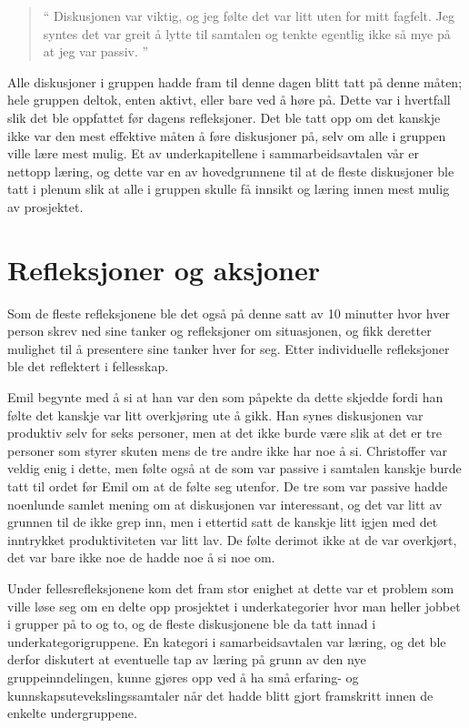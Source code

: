 \begin{quote}``
Diskusjonen var viktig, og jeg følte det var litt uten for mitt fagfelt. Jeg syntes det var greit å lytte til samtalen og tenkte egentlig ikke så mye på at jeg var passiv.
''\end{quote} 

Alle diskusjoner i gruppen hadde fram til denne dagen blitt tatt på denne måten; hele gruppen deltok, enten aktivt, eller bare ved å høre på. Dette var i hvertfall slik det ble oppfattet før dagens refleksjoner. Det ble tatt opp om det kanskje ikke var den mest effektive måten å føre diskusjoner på, selv om alle i gruppen ville lære mest mulig. Et av underkapitellene i sammarbeidsavtalen vår er nettopp læring, og dette var en av hovedgrunnene til at de fleste diskusjoner ble tatt i plenum slik at alle i gruppen skulle få innsikt og læring innen mest mulig av prosjektet.

\section{Refleksjoner og aksjoner}
Som de fleste refleksjonene ble det også på denne satt av 10 minutter hvor hver person skrev ned sine tanker og refleksjoner om situasjonen, og fikk deretter mulighet til å presentere sine tanker hver for seg. Etter individuelle refleksjoner ble det reflektert i fellesskap.

Emil begynte med å si at han var den som påpekte da dette skjedde fordi han følte det kanskje var litt overkjøring ute å gikk. Han synes diskusjonen var produktiv selv for seks personer, men at det ikke burde være slik at det er tre personer som styrer skuten mens de tre andre ikke har noe å si. Christoffer var veldig enig i dette, men følte også at de som var passive i samtalen kanskje burde tatt til ordet før Emil om at de følte seg utenfor. De tre som var passive hadde noenlunde samlet mening om at diskusjonen var interessant, og det var litt av grunnen til de ikke grep inn, men i ettertid satt de kanskje litt igjen med det inntrykket produktiviteten var litt lav. De følte derimot ikke at de var overkjørt, det var bare ikke noe de hadde noe å si noe om.

Under fellesrefleksjonene kom det fram stor enighet at dette var et problem som ville løse seg om en delte opp prosjektet i underkategorier hvor man heller jobbet i grupper på to og to, og de fleste diskusjonene ble da tatt innad i underkategorigruppene. En kategori i samarbeidsavtalen var læring, og det ble derfor diskutert at eventuelle tap av læring på grunn av den nye gruppeinndelingen, kunne gjøres opp ved å ha små erfaring- og kunnskapsutevekslingssamtaler når det hadde blitt gjort framskritt innen de enkelte undergruppene.

